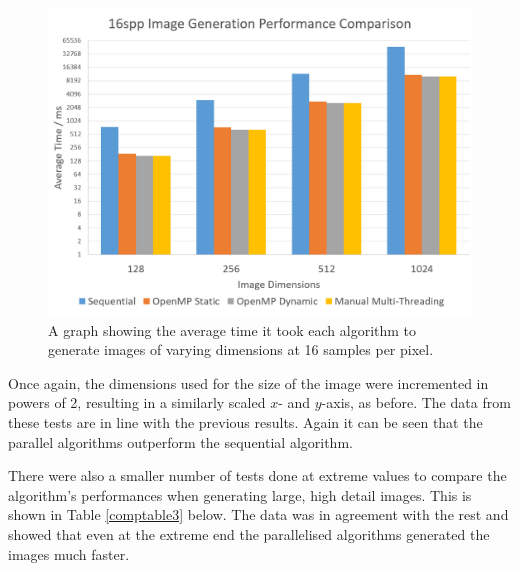 \documentclass[12pt,journal,transmag]{IEEEtran}
\begin{document}
	\begin{figure}[!h]
		\centering
		\includegraphics[width=\columnwidth]{IMAGES/performancecomparison2}
		\caption{A graph showing the average time it took each algorithm to generate images of varying dimensions at 16 samples per pixel.}
		\label{graph2}
	\end{figure}

	Once again, the dimensions used for the size of the image were incremented in powers of 2, resulting in a similarly scaled $x$- and $y$-axis, as before. The data from these tests are in line with the previous results. Again it can be seen that the parallel algorithms outperform the sequential algorithm.
	
	There were also a smaller number of tests done at extreme values to compare the algorithm's performances when generating large, high detail images. This is shown in Table \ref{comptable3} below. The data was in agreement with the rest and showed that even at the extreme end the parallelised algorithms generated the images much faster.
	
	\begin{table}[!h]
		\caption{Extreme Spp and Image Size Performance Comparison}
		\label{comptable3}
		\centering
	\end{table}
	
\end{document}
